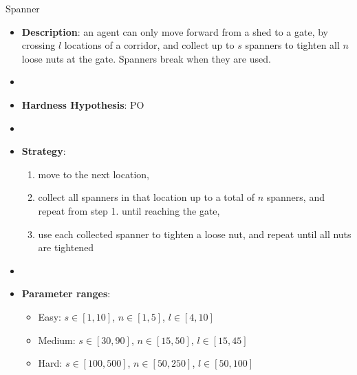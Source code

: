 \documentclass[aspectratio=169,xcolor=dvipsnames]{beamer}
\begin{document}
\begin{frame}{Spanner}

    \begin{itemize}
        \item \textbf{Description}: an agent can only move forward from a shed to a gate, by crossing $l$ locations of a corridor, and collect up to $s$ spanners to tighten all $n$ loose nuts at the gate. Spanners break when they are used.
        \item[]
        \item \textbf{Hardness Hypothesis}: PO %
        \item[]
        \item \textbf{Strategy}:
        \begin{enumerate}
            \item move to the next location,
            \item collect all spanners in that location up to a total of $n$ spanners, and repeat from step 1. until reaching the gate,
            \item use each collected spanner to tighten a loose nut, and repeat until all nuts are tightened
        \end{enumerate}
        \item[]
        \item \textbf{Parameter ranges}:
        \begin{itemize}
            \item Easy: $s\in[1,10]$, $n\in[1, 5]$, $l\in[4, 10]$
            \item Medium: $s\in[30,90]$, $n\in[15, 50]$, $l\in[15, 45]$
            \item Hard: $s\in[100,500]$, $n\in[50, 250]$, $l\in[50, 100]$
        \end{itemize}
    \end{itemize}

\end{frame}
\end{document}
